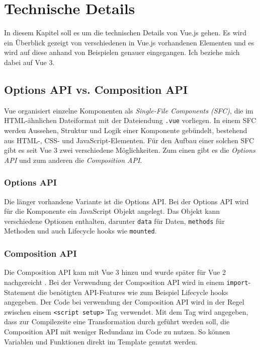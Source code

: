 

\chapter{Technische Details}\label{ch:technische-details}
In diesem Kapitel soll es um die technischen Details von Vue.js gehen.
Es wird ein Überblick gezeigt von verschiedenen in Vue.js vorhandenen Elementen
und es wird auf diese anhand von Beispielen genauer eingegangen.
Ich beziehe mich dabei auf Vue 3.


\section{Options API vs. Composition API}\label{sec:options-api-and-composition-api}
Vue organisiert einzelne Komponenten als \emph{Single-File Components (SFC)},
die im HTML-ähnlichen Dateiformat mit der Dateiendung \lstinline{.vue} vorliegen.
In einem SFC werden Aussehen, Struktur und Logik einer Komponente gebündelt, bestehend aus HTML-, CSS- und JavaScript-Elementen.
Für den Aufbau einer solchen SFC gibt es seit Vue 3 zwei verschiedene Möglichkeiten.
Zum einen gibt es die \emph{Options API} und zum anderen die \emph{Composition API}. \cite{vueIntroduction}

\subsection*{Options API}
Die länger vorhandene Variante ist die Options API.
Bei der Options API wird für die Komponente ein JavaScript Objekt angelegt.
Das Objekt kann verschiedene Optionen enthalten, darunter \lstinline{data} für Daten, \lstinline{methods} für Methoden und auch Lifecycle hooks wie \lstinline{mounted}.
\cite{vueIntroduction}

\subsection*{Composition API}
Die Composition API kam mit Vue 3 hinzu und wurde später für Vue 2 nachgereicht \cite{vueFAQ}.
Bei der Verwendung der Composition API wird in einem \lstinline{import}-Statement
die benötigten API-Features wie zum Beispiel Lifecycle hooks angegeben.
Der Code bei verwendung der Composition API wird in der Regel zwischen einem \lstinline{<script setup>} Tag verwendet.
Mit dem Tag wird angegeben, dass zur Compilezeite eine Transformation durch geführt werden soll,
die Composition API mit weniger Redundanz im Code zu nutzen.
So können Variablen und Funktionen direkt im Template genutzt werden.
\cite{vueIntroduction}

